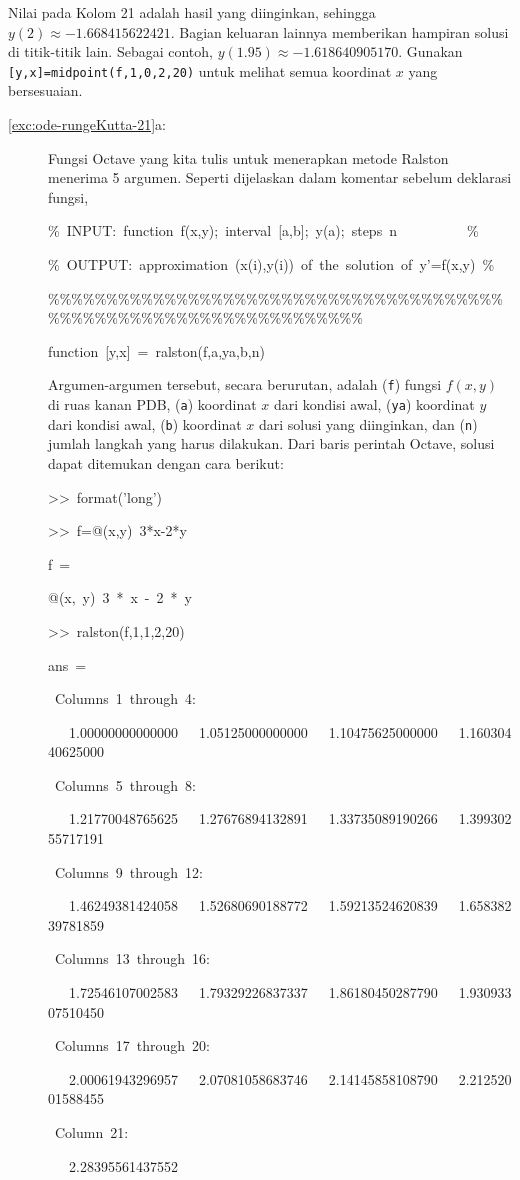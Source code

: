 Nilai pada Kolom 21 adalah hasil yang diinginkan, sehingga $y(2)\approx-1.668415622421$.
Bagian keluaran lainnya memberikan hampiran solusi di titik-titik
lain. Sebagai contoh, $y(1.95)\approx-1.618640905170$. Gunakan \texttt{{[}y,x{]}=midpoint(f,1,0,2,20)}
untuk melihat semua koordinat $x$ yang bersesuaian.
\begin{description}
\item [{\ref{exc:ode-rungeKutta-21}a:}] Fungsi Octave yang kita tulis
untuk menerapkan metode Ralston menerima 5 argumen. Seperti dijelaskan
dalam komentar sebelum deklarasi fungsi,

\begin{lyxcode}
\%~INPUT:~function~f(x,y);~interval~{[}a,b{]};~y(a);~steps~n~~~~~~~~~~\%

\%~OUTPUT:~approximation~(x(i),y(i))~of~the~solution~of~y'=f(x,y)~\%

\%\%\%\%\%\%\%\%\%\%\%\%\%\%\%\%\%\%\%\%\%\%\%\%\%\%\%\%\%\%\%\%\%\%\%\%\%\%\%\%\%\%\%\%\%\%\%\%\%\%\%\%\%\%\%\%\%\%\%\%\%\%\%\%\%\%

function~{[}y,x{]}~=~ralston(f,a,ya,b,n)~
\end{lyxcode}
Argumen-argumen tersebut, secara berurutan, adalah (\texttt{f}) fungsi
$f(x,y)$ di ruas kanan PDB, (\texttt{a}) koordinat $x$ dari kondisi
awal, (\texttt{ya}) koordinat $y$ dari kondisi awal, (\texttt{b})
koordinat $x$ dari solusi yang diinginkan, dan (\texttt{n}) jumlah
langkah yang harus dilakukan. Dari baris perintah Octave, solusi dapat
ditemukan dengan cara berikut:
\begin{lyxcode}
>\textcompwordmark >~format('long')

>\textcompwordmark >~f=@(x,y)~3{*}x-2{*}y

f~=

@(x,~y)~3~{*}~x~-~2~{*}~y

>\textcompwordmark >~ralston(f,1,1,2,20)

ans~=

~Columns~1~through~4:

~~~1.00000000000000~~~1.05125000000000~~~1.10475625000000~~~1.16030440625000

~Columns~5~through~8:

~~~1.21770048765625~~~1.27676894132891~~~1.33735089190266~~~1.39930255717191

~Columns~9~through~12:

~~~1.46249381424058~~~1.52680690188772~~~1.59213524620839~~~1.65838239781859

~Columns~13~through~16:

~~~1.72546107002583~~~1.79329226837337~~~1.86180450287790~~~1.93093307510450

~Columns~17~through~20:

~~~2.00061943296957~~~2.07081058683746~~~2.14145858108790~~~2.21252001588455

~Column~21:

~~~2.28395561437552
\end{lyxcode}
\end{description}
